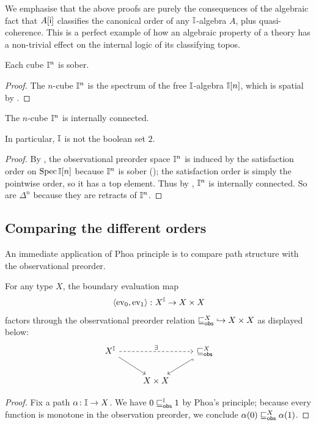 \begin{remark}\label{rem:normalalgebra}
  We emphasise that the above proofs are purely the consequences of the algebraic fact that $A[\mathsf{i}]$ classifies the canonical order of any $\mathbb{I}$-algebra $A$, plus quasi-coherence. This is a perfect example of how an algebraic property of a theory has a non-trivial effect on the internal logic of its classifying topos.
\end{remark}

\begin{corollary}[\AxiomSQCP]\label{lem:cubes-are-sober}
  Each cube $\mathbb{I}^n$ is sober.
\end{corollary}
\begin{proof}
  The $n$-cube $\mathbb{I}^n$ is the spectrum of the free $\mathbb{I}$-algebra $\mathbb{I}[n]$, which is spatial by .
\end{proof}

\begin{corollary}[\AxiomNT, \AxiomSQCP]\label{cor:cubes-internally-connected}
  The $n$-cube $\mathbb{I}^n$ is internally connected.
\end{corollary}

In particular, $\mathbb{I}$ is not the boolean set $2$.

\begin{proof}
   By , the observational preorder space $\mathbb{I}^n$ is induced by the satisfaction order on $\operatorname{Spec}\mathbb{I}[n]$ because $\mathbb{I}^n$ is sober (); the satisfaction order is simply the pointwise order, so it has a top element. Thus by , $\mathbb{I}^n$ is internally connected. So are $\Delta^n$ because they are retracts of $\mathbb{I}^n$.
\end{proof}

\subsection{Comparing the different orders}

An immediate application of Phoa principle is to compare path structure with the observational preorder.

\begin{observation}[\AxiomSQCP]
  For any type $X$, the boundary evaluation map 
  \[ \left\langle\mathrm{ev}_0,\mathrm{ev}_1\right\rangle\colon X^{\mathbb{I}}\to X\times X \] 
  factors through the observational preorder relation ${\obsle[X]}\hook X\times X$ as displayed below:
  \[ 
    \begin{tikzcd}
      X^\I 
        \arrow[rr,densely dashed, "\exists"]
        \arrow[dr]
      && 
      {\obsle[X]}
        \arrow[dl,hookrightarrow]
      \\ 
      &
      X\times X
    \end{tikzcd}
  \] 
\end{observation}
\begin{proof}
  Fix a path $\alpha\colon \mathbb{I}\to X$. We have $0\obsle[\I] 1$ by Phoa's principle; because every function is monotone in the observation preorder, we conclude $\alpha(0)\obsle[X] \alpha(1)$.
\end{proof}


